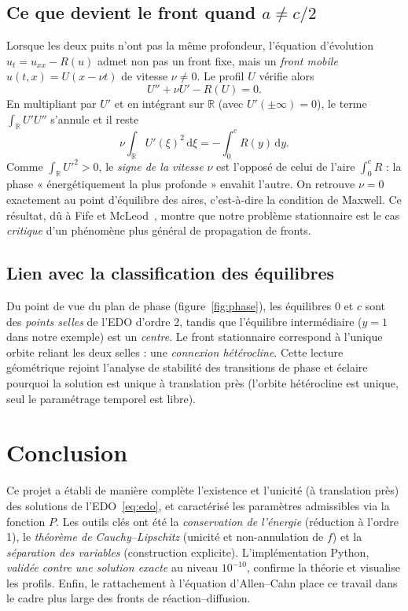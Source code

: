 \documentclass[11pt,a4paper]{article}
\theoremstyle{plain}
\theoremstyle{remark}
\newcommand{\R}{\mathbb{R}}
\newcommand{\dd}{\,\mathrm{d}}
\begin{document}
\subsection{Ce que devient le front quand $a\neq c/2$}
Lorsque les deux puits n'ont pas la même profondeur, l'équation d'évolution
$u_t=u_{xx}-R(u)$ admet non pas un front fixe, mais un \emph{front mobile}
$u(t,x)=U(x-\nu t)$ de vitesse $\nu\neq0$. Le profil $U$ vérifie alors
\[
  U''+\nu U'-R(U)=0.
\]
En multipliant par $U'$ et en intégrant sur $\R$ (avec $U'(\pm\infty)=0$), le
terme $\int_\R U'U''$ s'annule et il reste
\[
  \nu\int_\R U'(\xi)^2\dd\xi=-\int_0^c R(y)\dd y.
\]
Comme $\int_\R U'^2>0$, le \emph{signe de la vitesse} $\nu$ est l'opposé de celui
de l'aire $\int_0^c R$ : la phase « énergétiquement la plus profonde » envahit
l'autre. On retrouve $\nu=0$ exactement au point d'équilibre des aires, c'est-à-dire
la condition de Maxwell. Ce résultat, dû à Fife et McLeod~\cite{fifemcleod1977},
montre que notre problème stationnaire est le cas \emph{critique} d'un phénomène
plus général de propagation de fronts.

\subsection{Lien avec la classification des équilibres}
Du point de vue du plan de phase (figure~\ref{fig:phase}), les équilibres $0$ et
$c$ sont des \emph{points selles} de l'EDO d'ordre 2, tandis que l'équilibre
intermédiaire ($y=1$ dans notre exemple) est un \emph{centre}. Le front
stationnaire correspond à l'unique orbite reliant les deux selles : une
\emph{connexion hétérocline}. Cette lecture géométrique rejoint l'analyse de
stabilité des transitions de phase et éclaire pourquoi la solution est unique à
translation près (l'orbite hétérocline est unique, seul le paramétrage temporel
est libre).

\section{Conclusion}

Ce projet a établi de manière complète l'existence et l'unicité (à translation
près) des solutions de l'EDO~\eqref{eq:edo}, et caractérisé les paramètres
admissibles via la fonction $P$. Les outils clés ont été la \emph{conservation de
l'énergie} (réduction à l'ordre 1), le \emph{théorème de Cauchy–Lipschitz}
(unicité et non-annulation de $f$) et la \emph{séparation des variables}
(construction explicite). L'implémentation Python, \emph{validée contre une
solution exacte} au niveau $10^{-10}$, confirme la théorie et visualise les
profils. Enfin, le rattachement à l'équation d'Allen–Cahn place ce travail dans
le cadre plus large des fronts de réaction–diffusion.
\end{document}
